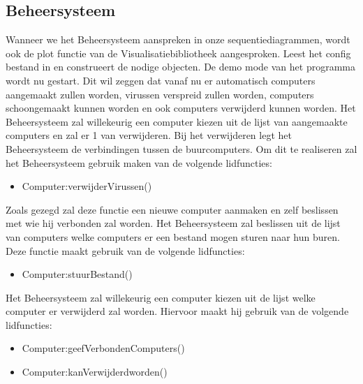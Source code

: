 \documentclass[a4paper,oneside]{report}
\begin{document}
\subsection{Beheersysteem}
Wanneer we het Beheersysteem aanspreken in onze sequentiediagrammen, wordt ook de plot functie van de Visualisatiebibliotheek aangesproken.
 Leest het config bestand in en construeert de nodige objecten.
 De demo mode van het programma wordt nu gestart. Dit wil zeggen dat vanaf nu er automatisch computers aangemaakt zullen worden, virussen verspreid zullen worden, computers schoongemaakt kunnen worden en ook computers verwijderd kunnen worden.
 Het Beheersysteem zal willekeurig een computer kiezen uit de lijst van aangemaakte computers en zal er 1 van verwijderen. Bij het verwijderen legt het Beheersysteem de verbindingen tussen de buurcomputers. Om dit te realiseren zal het Beheersysteem gebruik maken van de volgende lidfuncties:
\begin{itemize}
    \item Computer:verwijderVirussen()
\end{itemize}
 Zoals gezegd zal deze functie een nieuwe computer aanmaken en zelf beslissen met wie hij verbonden zal worden.
 Het Beheersysteem zal beslissen uit de lijst van computers welke computers er een bestand mogen sturen naar hun buren. Deze functie maakt gebruik van de volgende lidfuncties:
\begin{itemize}
    \item Computer:stuurBestand()
\end{itemize}
 Het Beheersysteem zal willekeurig een computer kiezen uit de lijst welke computer er verwijderd zal worden. Hiervoor maakt hij gebruik van de volgende lidfuncties:
\begin{itemize}
    \item Computer:geefVerbondenComputers()
    \item Computer:kanVerwijderdworden()
\end{itemize}
\end{document}
